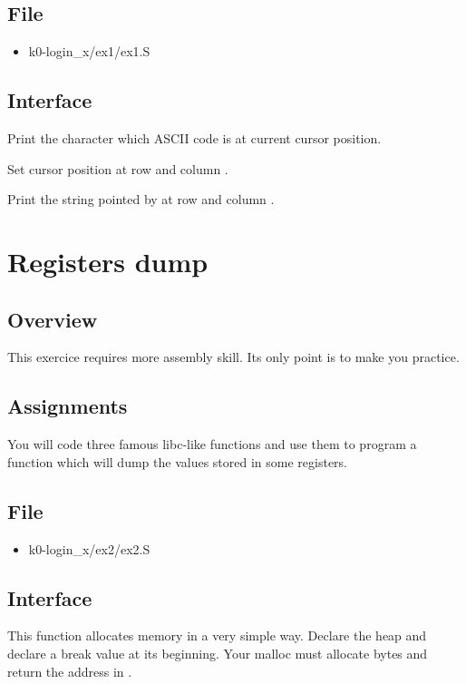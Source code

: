 \subsection*{File}
\begin{itemize}
  \item k0-login\_x/ex1/ex1.S
\end{itemize}

\subsection*{Interface}
{
  Print the character which ASCII code is  at current cursor
  position.
}

{
  Set cursor position at row  and column .
}

{
  Print the string pointed by  at row  and
  column .
}

%
%

\newpage

\section{Registers dump}

\subsection*{Overview}
This exercice requires more assembly skill. Its only point is to make you
practice.

\subsection*{Assignments}
You will code three famous libc-like functions and use them to program
a function which will dump the values stored in some registers.

\subsection*{File}
\begin{itemize}
  \item k0-login\_x/ex2/ex2.S
\end{itemize}

\subsection*{Interface}
{
  This function allocates memory in a very simple way. Declare the heap and
  declare a break value at its beginning.
  Your malloc must allocate  bytes and return the address
  in .
}

